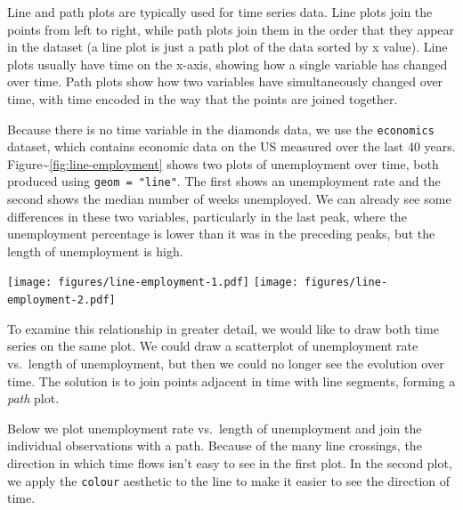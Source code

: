 Line and path plots are typically used for time series data. Line plots
join the points from left to right, while path plots join them in the
order that they appear in the dataset (a line plot is just a path plot
of the data sorted by x value). Line plots usually have time on the
x-axis, showing how a single variable has changed over time. Path plots
show how two variables have simultaneously changed over time, with time
encoded in the way that the points are joined together.

Because there is no time variable in the diamonds data, we use the
\texttt{economics} dataset, which contains economic data on the US
measured over the last 40 years.
Figure\textasciitilde{}\ref{fig:line-employment} shows two plots of
unemployment over time, both produced using \texttt{geom = "line"}. The
first shows an unemployment rate and the second shows the median number
of weeks unemployed. We can already see some differences in these two
variables, particularly in the last peak, where the unemployment
percentage is lower than it was in the preceding peaks, but the length
of unemployment is high. 
 

\begin{Shaded}
\begin{Highlighting}[]
\StringTok{ }  \NormalTok{)}
  \NormalTok{)}
\end{Highlighting}
\end{Shaded}

\texttt{[image: figures/line-employment-1.pdf]}
\texttt{[image: figures/line-employment-2.pdf]}

To examine this relationship in greater detail, we would like to draw
both time series on the same plot. We could draw a scatterplot of
unemployment rate vs.~length of unemployment, but then we could no
longer see the evolution over time. The solution is to join points
adjacent in time with line segments, forming a \emph{path} plot.

Below we plot unemployment rate vs.~length of unemployment and join the
individual observations with a path. Because of the many line crossings,
the direction in which time flows isn't easy to see in the first plot.
In the second plot, we apply the \texttt{colour} aesthetic to the line
to make it easier to see the direction of time.

